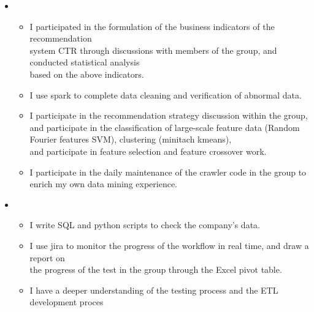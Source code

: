   \begin{itemize}[leftmargin=*]   
        \item
           {\small
      \begin{itemize}
      \item I participated in the formulation of the business indicators of the recommendation \\ system CTR through discussions with members of the group, and conducted statistical analysis \\based on the above indicators.
         \item I use spark to complete data cleaning and verification of abnormal data.
          \item I participate in the recommendation strategy discussion within the group, and participate in the classification of large-scale feature data (Random Fourier features SVM), clustering (minitach kmeans), \\ and participate in feature selection and feature crossover work.
           \item I participate in the daily maintenance of the crawler code in the group to enrich my own data mining experience.

            \end{itemize}

             }
     \item
        {\small
      \begin{itemize}
      \item I write SQL and python scripts to check the company's data.
        \item I use jira to monitor the progress of the workflow in real time, and draw a report on \\the progress of  the test in the group through the Excel pivot table.
         \item I have a deeper understanding of the testing process and the ETL development proces
         
       \end{itemize}
       }
             
  \end{itemize}

